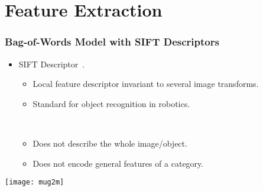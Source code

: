 \documentclass{beamer}
\begin{document}
\section{Feature Extraction}
\begin{frame}
  \frametitle{Bag-of-Words Model with SIFT Descriptors}

  \begin{itemize}
    \item SIFT Descriptor~\cite{lowe_object_1999}. 
      \begin{itemize}
        \item Local feature descriptor invariant to several image transforms.
        \item Standard for object recognition in robotics.

          ~
        \item Does not describe the whole image/object.
        \item Does not encode general features of a category.
      \end{itemize}
  \end{itemize}

  \centering
  \texttt{[image: mug2m]}
\end{frame}
\end{document}
